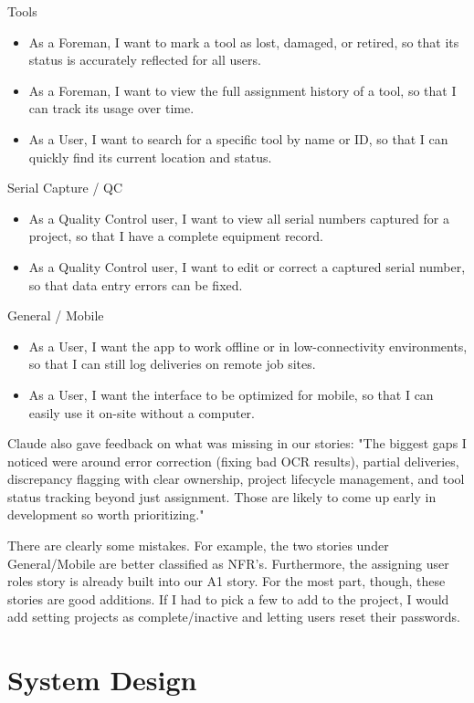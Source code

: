 \documentclass{article}
\begin{document}
Tools
\begin{itemize}
    \item As a Foreman, I want to mark a tool as lost, damaged, or retired, so that its status is accurately reflected for all users.
    \item As a Foreman, I want to view the full assignment history of a tool, so that I can track its usage over time.
    \item As a User, I want to search for a specific tool by name or ID, so that I can quickly find its current location and status.
\end{itemize}
 
Serial Capture / QC
\begin{itemize}
    \item As a Quality Control user, I want to view all serial numbers captured for a project, so that I have a complete equipment record.
    \item As a Quality Control user, I want to edit or correct a captured serial number, so that data entry errors can be fixed.
\end{itemize}
 
General / Mobile
\begin{itemize}
    \item As a User, I want the app to work offline or in low-connectivity environments, so that I can still log deliveries on remote job sites.
    \item As a User, I want the interface to be optimized for mobile, so that I can easily use it on-site without a computer.
\end{itemize}
 
Claude also gave feedback on what was missing in our stories: 
"The biggest gaps I noticed were around error correction (fixing bad OCR results), partial deliveries, discrepancy flagging with clear ownership, project lifecycle management, and tool status tracking beyond just assignment. Those are likely to come up early in development so worth prioritizing."

There are clearly some mistakes. For example, the two stories under General/Mobile are better classified as NFR's. Furthermore, the assigning user roles story is already built into our A1 story. For the most part, though, these stories are good additions. If I had to pick a few to add to the project, I would add setting projects as complete/inactive and letting users reset their passwords. 

\section{System Design}
\end{document}
